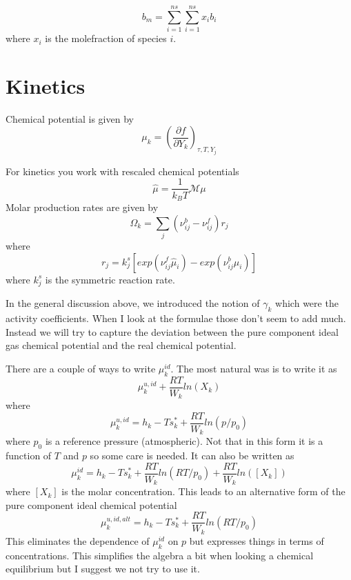 \documentclass[11pt]{article}
\begin{document}
\begin{equation}
    b_m = \sum_{i=1}^{ns}  \sum_{i=1}^{ns} x_i b_i
\end{equation}
where $x_i$ is the molefraction of species $i$. 

\section{Kinetics}

Chemical potential is given by
\[
\mu_k = \left( \frac{\partial f}{\partial Y_k}\right)_{\tau,T,Y_j}
\]

For kinetics you work with rescaled chemical potentials
\[
\hat{\mu} = \frac{1}{k_B T} \mathcal{M} \mu
\]
Molar production rates are given by
\[
\Omega_k = \sum_j (\nu_{ij}^b - \nu_{ij}^f) r_j
\]
where 
\[
r_j = k_j^s \left [ exp(\nu_{ij}^f \hat{\mu}_i) - exp ( \nu_{ij}^b \hat{\mu}_i) \right ] 
\]
where $k_j^s$ is the symmetric reaction rate.

In the general discussion above, we introduced the notion of
$\gamma_k$ which were the activity coefficients.
When I look at the formulae those don't seem to add much.
Instead we will try to capture the deviation between the pure component ideal gas chemical potential and
the real chemical potential.

There are a couple of ways to write $\mu_k^{id}$.
The most natural was is to write it as
\[
\mu_k^{u,id} + \frac{R T}{W_k} ln (X_k)
\]
where 
\begin{equation}
\mu_k^{u,id} = h_k - T s_k^* + \frac{R T}{W_k} ln(p/p_0)
\label{eq:chem_uid_frac}
\end{equation}
where $p_0$ is a reference pressure (atmospheric).
Not that in this form it is a function of $T$ and $p$ so some care is needed.
It can also be written as
\begin{equation}
\mu_k^{id} = h_k - T s_k^* + \frac{R T}{W_k} ln(RT/p_0) + \frac{R T}{W_k} ln([X_k])
\end{equation}
where $[X_k]$ is the molar concentration.
This leads to an alternative form of the pure component ideal chemical potential
\begin{equation}
\mu_k^{u,id,alt} = h_k - T s_k^* + \frac{R T}{W_k} ln(RT/p_0)
\label{eq:chem_uid_conc}
\end{equation}
This eliminates the dependence of $\mu_k^{id}$ on $p$ but expresses things in terms of
concentrations.  This simplifies the algebra a bit when looking a chemical equilibrium but
I suggest we not try to use it.
\end{document}
